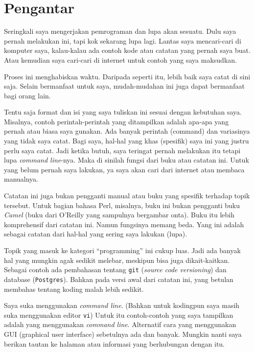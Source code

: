 \chapter*{Pengantar}

Seringkali saya mengerjakan pemrograman dan lupa akan sesuatu.
Dulu saya pernah melakukan ini, tapi kok sekarang lupa lagi.
Lantas saya mencari-cari di komputer saya, kalau-kalau ada contoh
kode atau catatan yang pernah saya buat.
Atau kemudian saya cari-cari di internet untuk contoh yang saya maksudkan.

Proses ini menghabiskan waktu.
Daripada seperti itu, lebih baik saya catat di sini saja.
Selain bermanfaat untuk saya, mudah-mudahan ini juga dapat bermanfaat
bagi orang lain.

Tentu saja format dan isi yang saya tuliskan ini sesuai dengan kebutuhan
saya. Misalnya, contoh perintah-perintah yang ditampilkan adalah apa-apa
yang pernah atau biasa saya gunakan.
Ada banyak perintah (command) dan variasinya yang tidak saya
catat.
Bagi saya, hal-hal yang khas (spesifik) saya ini yang justru perlu saya
catat. Jadi ketika butuh, saya teringat pernah melakukan itu tetapi
lupa {\em command line}-nya. Maka di sinilah fungsi dari buku atau
catatan ini. Untuk yang belum pernah saya lakukan, ya saya akan cari
dari internet atau membaca manualnya.

Catatan ini juga bukan pengganti manual atau buku yang spesifik
terhadap topik tersebut. Untuk bagian bahasa Perl, misalnya,
buku ini bukan pengganti buku {\em Camel} (buku dari O'Reilly
yang sampulnya bergambar onta).
Buku itu lebih komprehensif dari catatan ini.
Namun fungsinya memang beda. Yang ini adalah sebagai catatan
dari hal-hal yang sering saya lakukan (lupa).

Topik yang masuk ke kategori ``programming'' ini cukup luas.
Jadi ada banyak hal yang mungkin agak sedikit melebar, meskipun
bisa juga dikait-kaitkan.
Sebagai contoh ada pembahasan tentang \texttt{git} 
({\em source code versioning}) dan database (\texttt{Postgres}).
Bahkan pada versi awal dari catatan ini, yang betulan membahas
tentang koding malah lebih sedikit.

Saya suka menggunakan {\em command line}. 
(Bahkan untuk kodingpun saya masih suka menggunakan editor \texttt{vi})
Untuk itu contoh-contoh yang saya tampilkan adalah yang menggunakan
{\em command line}.
Alternatif cara yang menggunakan GUI (graphical user interface)
sebetulnya ada dan banyak. Mungkin nanti saya berikan tautan
ke halaman atau informasi yang berhubungan dengan itu.

